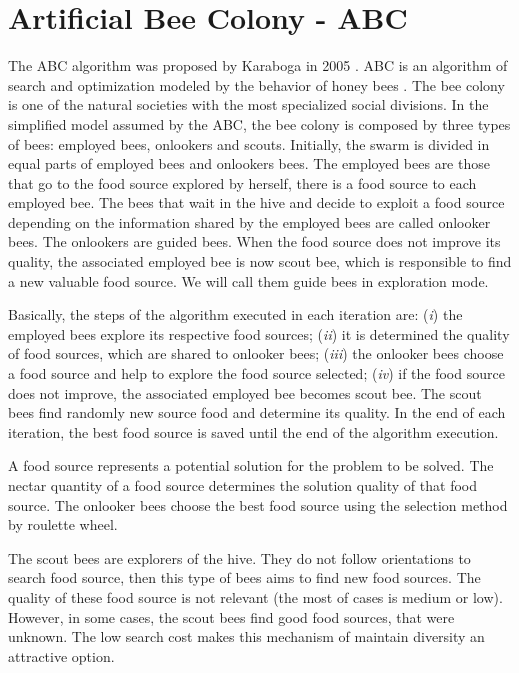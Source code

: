 \section{Artificial Bee Colony - ABC}\label{sec:ABC}
The ABC algorithm was proposed by Karaboga in 2005 \cite{ABC:Karaboga2005}. ABC is an algorithm of search and optimization modeled by the behavior of honey bees \cite{ABC:Karaboga2006} \cite{ABC:Karaboga2007} \cite{ABC:Karaboga2009a} \cite{ABC:Karaboga2009b} \cite{ABC:Ziarati2011}. The bee colony is one of the natural societies with the most specialized social divisions. In the simplified model assumed by the ABC, the bee colony is composed by three types of bees: employed bees, onlookers and scouts. Initially, the swarm is divided in equal parts of employed bees and onlookers bees. The employed bees are those that go to the food source explored by herself, there is a food source to each employed bee. The bees that wait in the hive and decide to exploit a food source depending on the information shared by the employed bees are called onlooker bees. The onlookers are guided bees. When the food source does not improve its quality, the associated employed bee is now scout bee, which is responsible to find a new valuable food source. We will call them guide bees in exploration mode.

Basically, the steps of the algorithm executed in each iteration are: (\emph{i}) the employed bees explore its respective food sources; (\emph{ii}) it is determined the quality of food sources, which are shared to onlooker bees; (\emph{iii}) the onlooker bees choose a food source and help to explore the food source selected; (\emph{iv}) if the food source does not improve, the associated employed bee becomes scout bee. The scout bees find randomly new source food and determine its quality. In the end of each iteration, the best food source is saved until the end of the algorithm execution.

A food source represents a potential solution for the problem to be solved. The nectar quantity of a food source determines the solution quality of that food source. The onlooker bees choose the best food source using the selection method by roulette wheel.

The scout bees are explorers of the hive. They do not follow orientations to search food source, then this type of bees aims to find new food sources. The quality of these food source is not relevant (the most of cases is medium or low). However, in some cases, the scout bees find good food sources, that were unknown. The low search cost makes this mechanism of maintain diversity an attractive option.


